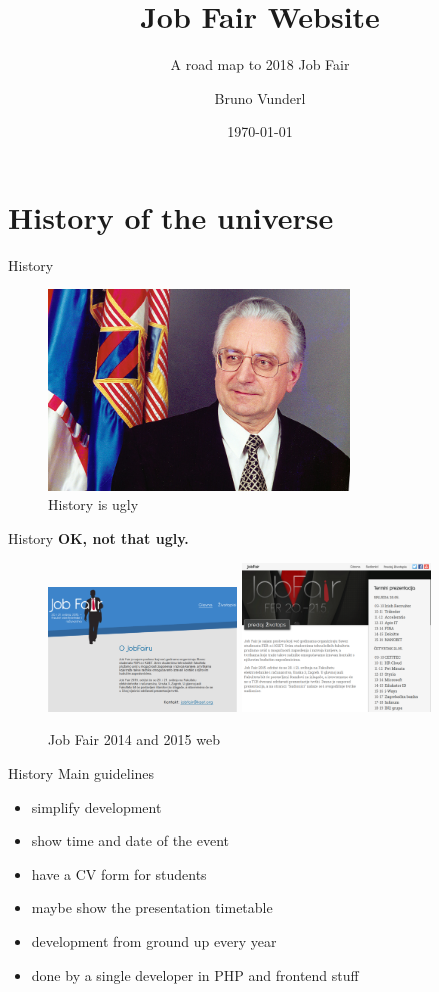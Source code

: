 \documentclass{beamer}
\title{Job Fair Website}
\subtitle{A road map to 2018 Job Fair}
\date{\today}
\author{Bruno Vunderl}
\institute{Klub studenata elektrotehnike}
\begin{document}
	\maketitle
	
	\section{History of the universe}
	
	\begin{frame}{History}
		\begin{figure}
			\includegraphics[width=8cm]{francek}
			\caption{History is ugly}
		\end{figure}
	\end{frame}
	
	\begin{frame}{History}
		\centering
		\textbf{OK, not that ugly.}
		\begin{figure}
			\includegraphics[width=5cm]{jf-14}
			\vspace{1cm}
			\includegraphics[width=5cm]{jf-15}
			\caption{Job Fair 2014 and 2015 web}
		\end{figure}
	\end{frame}

	\begin{frame}{History}
		Main guidelines
		\begin{itemize}
			\item simplify development
			\item show time and date of the event
			\item have a CV form for students
			\item maybe show the presentation timetable
			\item development from ground up every year
			\item done by a single developer in PHP and frontend stuff
		\end{itemize}
	\end{frame}
\end{document}
